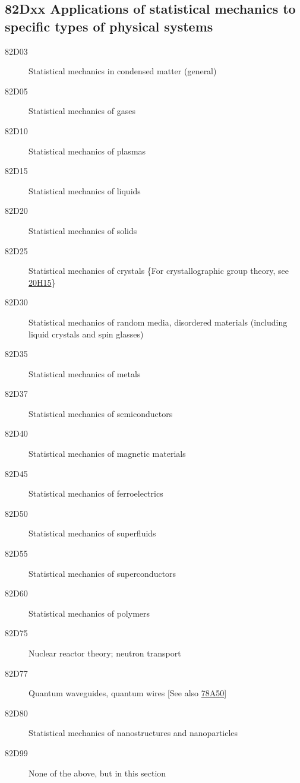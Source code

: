 \documentclass[letterpaper]{article}
\begin{document}
\subsection*{82Dxx  Applications of statistical mechanics to specific types of physical systems }\label{82Dxx}
\begin{description}  
\item [82D03]\label{82D03} Statistical mechanics in condensed matter (general)
\item [82D05]\label{82D05} Statistical mechanics of gases
\item [82D10]\label{82D10} Statistical mechanics of plasmas
\item [82D15]\label{82D15} Statistical mechanics of liquids
\item [82D20]\label{82D20} Statistical mechanics of solids
\item [82D25]\label{82D25} Statistical mechanics of crystals \{For crystallographic group theory, see \hyperref[20H15]{20H15}\}
\item [82D30]\label{82D30} Statistical mechanics of random media, disordered materials (including liquid crystals and spin glasses)
\item [82D35]\label{82D35} Statistical mechanics of metals
\item [82D37]\label{82D37} Statistical mechanics of semiconductors
\item [82D40]\label{82D40} Statistical mechanics of magnetic materials
\item [82D45]\label{82D45} Statistical mechanics of ferroelectrics
\item [82D50]\label{82D50} Statistical mechanics of superfluids
\item [82D55]\label{82D55} Statistical mechanics of superconductors
\item [82D60]\label{82D60} Statistical mechanics of polymers
\item [82D75]\label{82D75} Nuclear reactor theory; neutron transport
\item [82D77]\label{82D77} Quantum waveguides, quantum wires [See also \hyperref[78A50]{78A50}]
\item [82D80]\label{82D80} Statistical mechanics of nanostructures and nanoparticles
\item [82D99]\label{82D99} None of the above, but in this section
\end{description}
\end{document}
